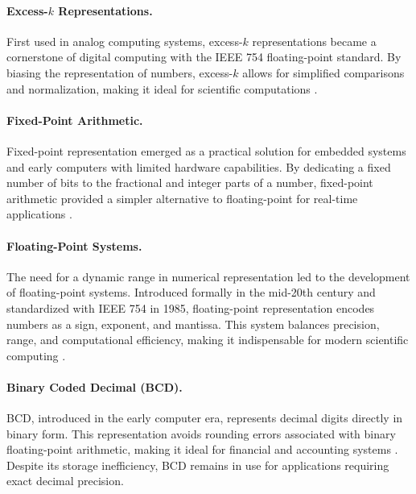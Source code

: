 \paragraph{Excess-\( k \) Representations.}
First used in analog computing systems, excess-\( k \) representations became a cornerstone of digital computing with the IEEE 754 floating-point standard. By biasing the representation of numbers, excess-\( k \) allows for simplified comparisons and normalization, making it ideal for scientific computations \cite{goldberg1991}.

\paragraph{Fixed-Point Arithmetic.}
Fixed-point representation emerged as a practical solution for embedded systems and early computers with limited hardware capabilities. By dedicating a fixed number of bits to the fractional and integer parts of a number, fixed-point arithmetic provided a simpler alternative to floating-point for real-time applications \cite{Parhami2010}.

\paragraph{Floating-Point Systems.}
The need for a dynamic range in numerical representation led to the development of floating-point systems. Introduced formally in the mid-20th century and standardized with IEEE 754 in 1985, floating-point representation encodes numbers as a sign, exponent, and mantissa. This system balances precision, range, and computational efficiency, making it indispensable for modern scientific computing \cite{goldberg1991}.

\paragraph{Binary Coded Decimal (BCD).}
BCD, introduced in the early computer era, represents decimal digits directly in binary form. This representation avoids rounding errors associated with binary floating-point arithmetic, making it ideal for financial and accounting systems \cite{randell1982origins}. Despite its storage inefficiency, BCD remains in use for applications requiring exact decimal precision.


